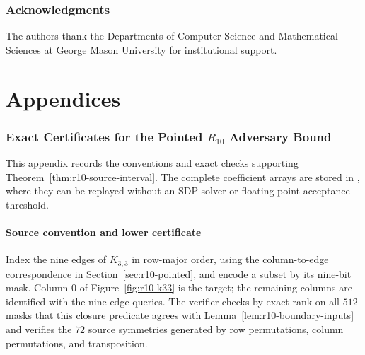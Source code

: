 \documentclass[11pt]{article}
\numberwithin{equation}{section}
\theoremstyle{remark}
\begin{document}
\section*{Acknowledgments}

The authors thank the Departments of Computer Science and Mathematical
Sciences at George Mason University for institutional support.

{}
\begingroup
\small
\setlength{\parskip}{0pt}


\endgroup

\part{Appendices}
\appendix

\section{Exact Certificates for the Pointed \texorpdfstring{$R_{10}$}{R10} Adversary Bound}
\label{app:r10-adversary-certificates}

This appendix records the conventions and exact checks supporting
Theorem~\ref{thm:r10-source-interval}. The complete coefficient arrays are
stored in , where
they can be replayed without an SDP solver or floating-point acceptance
threshold.

\subsection{Source convention and lower certificate}
\label{app:r10-exact-source-certificate}

Index the nine edges of $K_{3,3}$ in row-major order, using the column-to-edge
correspondence in Section~\ref{sec:r10-pointed}, and encode a subset by
its nine-bit mask. Column $0$ of Figure~\ref{fig:r10-k33} is the target; the
remaining columns are identified with the nine edge queries. The verifier
checks by exact rank on all $512$ masks that this closure predicate agrees
with Lemma~\ref{lem:r10-boundary-inputs} and verifies the $72$ source
symmetries generated by row permutations, column permutations, and
transposition.
\end{document}
